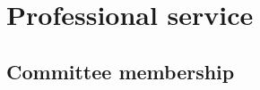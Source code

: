 \documentclass[letterpaper]{article}
\renewenvironment{itemize}{
  \begin{list}{}{
    \setlength{\leftmargin}{1.5em}
  }
}{
  \end{list}
}
\begin{document}





    
    
    

\section*{Professional service}

\subsection*{Committee membership}
\end{document}
